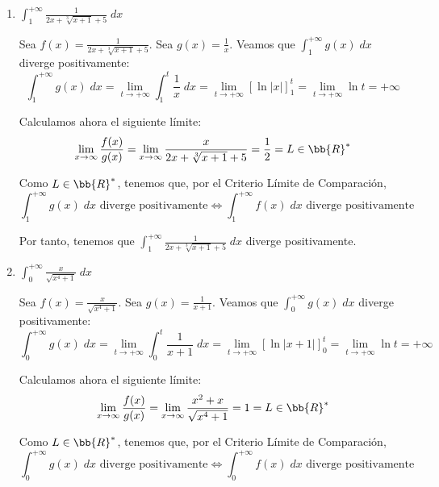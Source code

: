 \begin{ejercicio}
\begin{enumerate}
    \item $\displaystyle \int_1^{+\infty} \frac{1}{2x+\sqrt[3]{x+1} +5}\;dx$

    Sea $f(x)= \frac{1}{2x+\sqrt[3]{x+1} +5}$.
    Sea $g(x)=\frac{1}{x}$. Veamos que $\int_1^{+\infty} g(x)\;dx$ diverge positivamente:
    \begin{equation*}
        \int_1^{+\infty} g(x)\;dx
        = \lim_{t\to +\infty} \int_1^t \frac{1}{x}\;dx
        = \lim_{t\to +\infty} [\ln |x|]_1^t
        = \lim_{t\to +\infty} \ln t = +\infty
    \end{equation*}

    Calculamos ahora el siguiente límite:
    \begin{equation*}
        \lim_{x\to \infty} \frac{f(x)}{g(x)}
        = \lim_{x\to \infty} \frac{x}{{2x+\sqrt[3]{x+1} +5}} = \frac{1}{2}=L\in \bb{R}^\ast
    \end{equation*}
    
    Como $L\in \bb{R}^\ast$, tenemos que, por el Criterio Límite de Comparación,
    \begin{equation*}
        \int_1^{+\infty} g(x)\;dx \text{ diverge positivamente} \Longleftrightarrow 
        \int_1^{+\infty} f(x)\;dx \text{ diverge positivamente}
    \end{equation*}

    Por tanto, tenemos que  $\displaystyle \int_1^{+\infty} \frac{1}{2x+\sqrt[3]{x+1} +5}\;dx$ diverge positivamente.


    \item $\displaystyle \int_0^{+\infty} \frac{x}{\sqrt{x^4+1}}\;dx$

    Sea $f(x)= \frac{x}{\sqrt{x^4+1}}$.
    Sea $g(x)=\frac{1}{x+1}$. Veamos que $\int_0^{+\infty} g(x)\;dx$ diverge positivamente:
    \begin{equation*}
        \int_0^{+\infty} g(x)\;dx
        = \lim_{t\to +\infty} \int_0^t \frac{1}{x+1}\;dx
        = \lim_{t\to +\infty} [\ln |x+1|]_0^t
        = \lim_{t\to +\infty} \ln t = +\infty
    \end{equation*}

    Calculamos ahora el siguiente límite:
    \begin{equation*}
        \lim_{x\to \infty} \frac{f(x)}{g(x)}
        = \lim_{x\to \infty} \frac{x^2+x}{\sqrt{x^4+1}} = 1=L\in \bb{R}^\ast
    \end{equation*}
    
    Como $L\in \bb{R}^\ast$, tenemos que, por el Criterio Límite de Comparación,
    \begin{equation*}
        \int_0^{+\infty} g(x)\;dx \text{ diverge positivamente} \Longleftrightarrow 
        \int_0^{+\infty} f(x)\;dx \text{ diverge positivamente}
    \end{equation*}


\end{enumerate}
\end{ejercicio}
